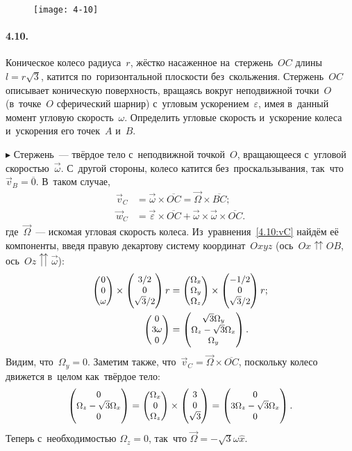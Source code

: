 \documentclass{weekly}
\begin{document}

\begin{wrapfigure}[6]{r}{4.7cm}\vspace{-4mm}
    \texttt{[image: 4-10]}
\end{wrapfigure}
\paragraph{4.10.} Коническое колесо радиуса~$r$, жёстко насаженное
на~стержень~$OC$ длины $l = r\sqrt{3}$, катится по~горизонтальной
плоскости без~скольжения. Стержень~$OC$ описывает коническую поверхность,
вращаясь вокруг неподвижной точки~$O$ (в~точке~$O$ сферический шарнир)
с~угловым ускорением~$\varepsilon$, имея в~данный момент
угловую скорость~$\omega$. Определить угловые скорость и~ускорение
колеса и~ускорения его точек~$A$ и~$B$.

$\blacktriangleright$
Стержень~--- твёрдое тело с~неподвижной точкой~$O$, вращающееся
с~угловой скоростью~$\vec\omega$. С~другой стороны, колесо катится
без~проскальзывания, так~что~$\vec v_B = \overline{0}$.
В~таком случае,
\begin{align}
    \vec v_C &= \vec\omega \times \overline{OC}
        = \vec\Omega \times \overline{BC}; \label{4.10:vC}\\
    \vec w_C &= \vec\varepsilon \times \overline{OC} +
            \vec\omega \times \vec\omega \times \overline{OC}.
\end{align}
где~$\vec\Omega$~--- искомая угловая скорость колеса.
Из~уравнения~\eqref{4.10:vC} найдём её компоненты,
введя правую декартову систему координат~$Oxyz$
(ось~$Ox \upuparrows OB$, ось~$Oz \upuparrows \vec\omega$):
\begin{align}
    \small\begin{pmatrix}0\\0\\\omega\end{pmatrix} \times \small\begin{pmatrix}3/2\\0\\\sqrt{3}/2\end{pmatrix} r &=
            \small\begin{pmatrix}\Omega_x\\\Omega_y\\\Omega_z\end{pmatrix} \times
            \small\begin{pmatrix}-1/2\\0\\\sqrt{3}/2\end{pmatrix} r; \\
    \small\begin{pmatrix}0\\3\omega\\0\end{pmatrix} &=
            \small\begin{pmatrix}\sqrt{3}\Omega_y\\\Omega_z-\sqrt{3}\Omega_x\\\Omega_y\end{pmatrix}.
\end{align}
Видим, что~$\Omega_y = 0$.
Заметим также, что~$\vec v_C = \vec\Omega \times \overline{OC}$,
поскольку колесо движется в~целом как~твёрдое тело:
\begin{align}
    \small\begin{pmatrix}0\\\Omega_z - \sqrt{3}\Omega_x\\0\end{pmatrix} =
            \small\begin{pmatrix}\Omega_x\\0\\\Omega_z\end{pmatrix} \times
            \small\begin{pmatrix}3\\0\\\sqrt{3}\end{pmatrix}
        = \small\begin{pmatrix}0\\3\Omega_z - \sqrt{3}\Omega_x\\0\end{pmatrix}.
\end{align}
Теперь с~необходимостью $\Omega_z = 0$, так~что
$\vec\Omega = -\sqrt{3}\omega \hat x$.
\end{document}
